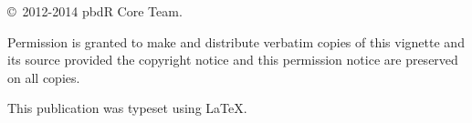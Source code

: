 
\null
\vfill
\copyright\ 2012-2014 pbdR Core Team.

Permission is granted to make and distribute verbatim copies of
this vignette and its source provided the copyright notice and
this permission notice are preserved on all copies.

This publication was typeset using \LaTeX.
